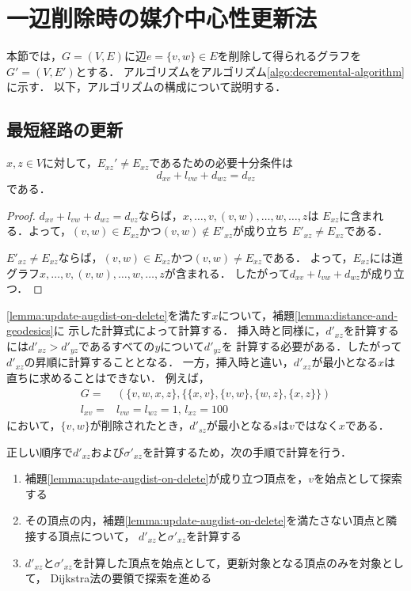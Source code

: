 \section{一辺削除時の媒介中心性更新法}
\label{sect:update-bc-on-delete}
本節では，$G=(V,E)$に辺$e=\{v,w\}\in E$を削除して得られるグラフを$G'=(V,E')$とする．
アルゴリズムをアルゴリズム\ref{algo:decremental-algorithm}に示す．
以下，アルゴリズムの構成について説明する．

\subsection{最短経路の更新}
\label{subsect:update-augdist-on-delete}

\begin{lemma}
  \label{lemma:update-augdist-on-delete}
  $x,z\in V$に対して，$E_{xz}'\neq E_{xz}$であるための必要十分条件は
  \[ d_{xv}+l_{vw}+d_{wz}=d_{vz} \]
  である．
\end{lemma}
\begin{proof}
  $d_{xv}+l_{vw}+d_{wz}=d_{vz}$ならば，$x,\ldots,v,(v,w),\ldots,w,\ldots,z$は
  $E_{xz}$に含まれる．よって，$(v,w)\in E_{xz}$かつ$(v,w)\notin E'_{xz}$が成り立ち
  $E'_{xz}\neq E_{xz}$である．

  $E'_{xz}\neq E_{xz}$ならば，$(v,w)\in E_{xz}$かつ$(v,w)\neq E_{xz}$である．
  よって，$E_{xz}$には道グラフ$x,\ldots,v,(v,w),\ldots,w,\ldots,z$が含まれる．
  したがって$d_{xv}+l_{vw}+d_{wz}$が成り立つ．
\end{proof}

\ref{lemma:update-augdist-on-delete}を満たす$x$について，補題\ref{lemma:distance-and-geodesics}に
示した計算式によって計算する．
挿入時と同様に，$d'_{xz}$を計算するには$d'_{xz}>d'_{yz}$であるすべての$y$について$d'_{yz}$を
計算する必要がある．したがって$d'_{xz}$の昇順に計算することとなる．
一方，挿入時と違い，$d'_{xz}$が最小となる$x$は直ちに求めることはできない．
例えば，
\begin{equation*}
  \begin{aligned}
    G=&(\{v,w,x,z\},\{\{x,v\},\{v,w\},\{w,z\},\{x,z\}\})\\
    l_{xv}=&l_{vw}=l_{wz}=1,\,l_{xz}=100
  \end{aligned}
\end{equation*}
において，$\{v,w\}$が削除されたとき，$d'_{sz}$が最小となる$s$は$v$ではなく$x$である．

正しい順序で$d'_{xz}$および$\sigma'_{xz}$を計算するため，次の手順で計算を行う．
\begin{enumerate}
\item 補題\ref{lemma:update-augdist-on-delete}が成り立つ頂点を，$v$を始点として探索する
\item その頂点の内，補題\ref{lemma:update-augdist-on-delete}を満たさない頂点と隣接する頂点について，
  $d'_{xz}$と$\sigma'_{xz}$を計算する
\item $d'_{xz}$と$\sigma'_{xz}$を計算した頂点を始点として，更新対象となる頂点のみを対象として，
  Dijkstra法の要領で探索を進める
\end{enumerate}

